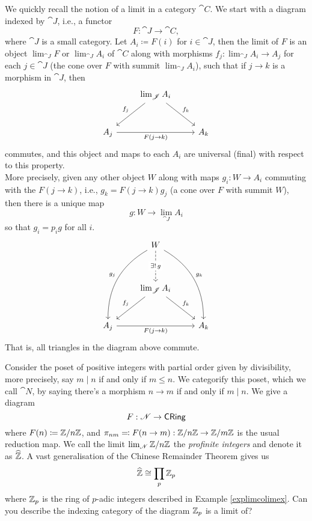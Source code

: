 \vspace*{1em}

We quickly recall the notion of a limit in a category $\cat{C}$. We start with a diagram indexed by $\cat{J}$, i.e., a functor
\[F:\cat{J} \to \cat{C},\]
where $\cat{J}$ is a small category. Let $A_i \coloneqq F(i)$ for $i\in \cat{J}$, then the limit of $F$ is an object $\lim_{\cat{J}} F$ or $\lim_{\cat{J}} A_i$ of $\cat{C}$ along with morphisms $f_j: \lim_{\cat{J}}A_i \to A_j$ for each $j \in \cat{J}$ (the cone over $F$ with summit $\lim_{\cat{J}}A_i$), such that if $j \to k$ is a morphism in $\cat{J}$, then
\[\begin{tikzcd}[row sep=large]
                              & \lim_{\cat{J}}A_i \arrow[ld, "f_j"'] \arrow[rd, "f_k"] &     \\
A_j \arrow[rr, "F(j \to k)"'] &                                                        & A_k
\end{tikzcd}\]
commutes, and this object and maps to each $A_i$ are universal (final) with respect to this property.\\[0.5em]
More precisely, given any other object $W$ along with maps $g_i : W \to A_i$ commuting with the $F(j \to k)$, i.e., $g_k = F(j \to k)g_j$ (a cone over $F$ with summit $W$), then there is a unique map
\[g: W \to \textstyle\lim_{\cat{J}}A_i\]
so that $g_i = p_ig$ for all $i$.
\[\begin{tikzcd}[row sep=large]
                              & W \arrow[ldd, "g_j"', bend right] \arrow[rdd, "g_k", bend left] \arrow[d, "{\exists !\, g}" description, dashed] &     \\[1em]
                              & \lim_{\cat{J}}A_i \arrow[ld, "f_j"'] \arrow[rd, "f_k"]                                                           &     \\
A_j \arrow[rr, "F(j \to k)"'] &                                                                                                                  & A_k
\end{tikzcd}\]
That is, all triangles in the diagram above commute.

\vspace*{0.1in}

\begin{example}
Consider the poset of positive integers with partial order given by divisibility, more precisely, say $m\mid n$ if and only if $m\leq n$. We categorify this poset, which we call $\cat{N}$, by saying there's a morphism $n \to m$ if and only if $m\mid n$. We give a diagram
\[F: \mathscr{N} \to \mathsf{CRing}\]
where $F(n) \coloneqq \mathbb Z/n\mathbb Z$, and $\pi_{nm} \eqqcolon F(n \to m):\mathbb Z/n\mathbb Z \to \mathbb Z/m\mathbb Z$ is the usual reduction map. We call the limit $\lim_{\mathscr{N}}\mathbb Z/n\mathbb Z$ the \emph{profinite integers} and denote it as $\widehat{\mathbb Z}$. A vast generalisation of the Chinese Remainder Theorem gives us
\[\widehat{\mathbb Z} \cong \prod_{p}\mathbb Z_p\]
where $\mathbb Z_p$ is the ring of $p$-adic integers described in Example \ref{explimcolimex}. Can you describe the indexing category of the diagram $\mathbb Z_p$ is a limit of?
\end{example}

